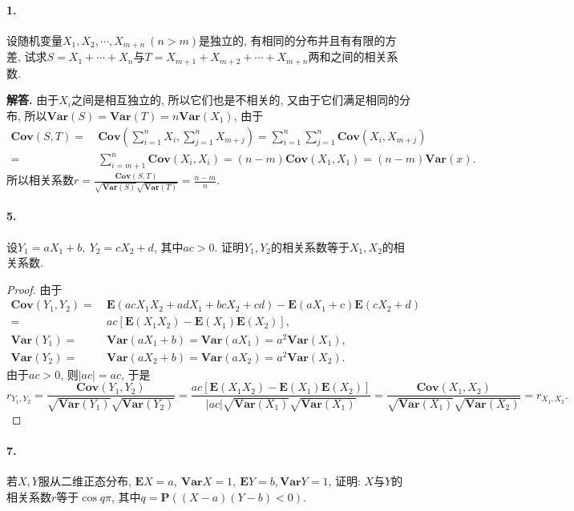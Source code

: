 \documentclass[12pt, a4paper, oneside]{ctexart}
\newenvironment{solution}{\par\noindent\textbf{解答. }}{\bigskip\par}
\def\P{\textbf{P}}      %
\def\E{\textbf{E}}      %
\def\var{\textbf{Var}}  %
\def\cov{\textbf{Cov}}  %
\begin{document}
\paragraph{1.}设随机变量$X_1,X_2,\cdots,X_{m+n}\ (n > m)$是独立的, 有相同的分布并且有有限的方差, 试求$S = X_1+\cdots + X_n$与$T = X_{m+1}+X_{m+2}+\cdots+X_{m+n}$两和之间的相关系数.
\begin{solution}
    由于$X_i$之间是相互独立的, 所以它们也是不相关的, 又由于它们满足相同的分布, 所以$\var(S) = \var(T) = n\var(X_1)$, 由于
    \begin{equation*}
        \begin{aligned}
            \cov(S, T) =&\ \cov \left(\sum_{i=1}^n X_i,\sum_{j=1}^n X_{m+j}\right) = \sum_{i=1}^n\sum_{j=1}^n\cov\left(X_i, X_{m+j}\right)\\
            =&\ \sum_{i=m+1}^n\cov(X_i, X_i) = (n-m)\cov (X_1, X_1) = (n-m)\var(x).
        \end{aligned}
    \end{equation*}
    所以相关系数$r = \frac{\cov(S, T)}{\sqrt{\var(S)}\sqrt{\var(T)}} = \frac{n-m}{n}.$
\end{solution}
\paragraph{5.}设$Y_1=aX_1+b,\ Y_2 = cX_2+d$, 其中$ac > 0$. 证明$Y_1, Y_2$的相关系数等于$X_1, X_2$的相关系数.
\begin{proof}
    由于
    \begin{align*}
        \cov(Y_1, Y_2) =&\ \E(acX_1X_2+adX_1+bcX_2+cd) - \E(aX_1+c)\E(cX_2+d)\\
        =&\ ac[\E(X_1X_2)-\E(X_1)\E(X_2)],\\
        \var(Y_1) =&\ \var(aX_1+b) = \var(aX_1) = a^2\var(X_1),\\
        \var(Y_2) =&\ \var(aX_2+b) = \var(aX_2) = a^2\var(X_2).
    \end{align*}
    由于$ac >0$, 则$|ac| = ac$, 于是
    \begin{equation*}
        r_{Y_1,Y_2} = \frac{\cov(Y_1,Y_2)}{\sqrt{\var(Y_1)}\sqrt{\var(Y_2)}} = \frac{ac[\E(X_1X_2)-\E(X_1)\E(X_2)]}{|ac|\sqrt{\var(X_1)}\sqrt{\var(X_1)}} = \frac{\cov(X_1,X_2)}{\sqrt{\var(X_1)}\sqrt{\var(X_2)}} = r_{X_1,X_2}.
    \end{equation*}
\end{proof}
\paragraph{7.}若$X, Y$服从二维正态分布, $\E X = a,\ \var X = 1,\ \E Y = b, \var Y = 1$, 证明: $X$与$Y$的相关系数$r$等于$\cos q\pi$, 其中$q = \P((X-a)(Y-b) < 0)$.
\end{document}
